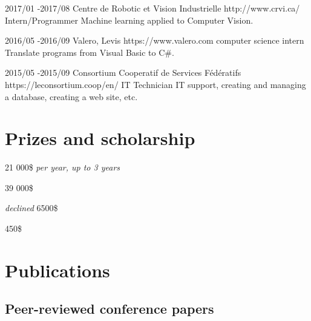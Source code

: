 \documentclass[10pt]{article} %
\begin{document}

\job
{2017/01 -}{2017/08}
{Centre de Robotic et Vision Industrielle}
{http://www.crvi.ca/}
{Intern/Programmer}
{Machine learning applied to Computer Vision.}

\job
{2016/05 -}{2016/09}
{Valero, Levis}
{https://www.valero.com}
{computer science intern}
{Translate programs from Visual Basic to C\#.}

\job
{2015/05 -}{2015/09}
{Consortium Cooperatif de Services Fédératifs}
{https://leconsortium.coop/en/}
{IT Technician}
{IT support, creating and managing a database, creating a web site, etc.}


\section{Prizes and scholarship}

{
 21 000\$ \textit{per year, up to 3 years} \\
}

{
\textit{} 39 000\$\\
}

{
\textit{declined} 6500\$\\
}

{
\textit{} 450\$\\
}

\section{Publications}
\subsection{Peer-reviewed conference papers}
\end{document}
